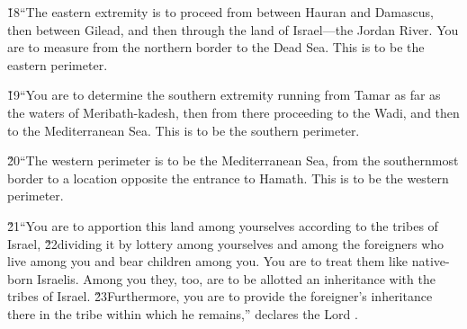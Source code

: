 \v{18}``The eastern extremity is to proceed from between Hauran and Damascus, then between Gilead, and then through the land of Israel---the Jordan River. You are to measure from the northern border to the Dead Sea. This is to be the eastern perimeter.

\v{19}``You are to determine the southern extremity running from Tamar as far as the waters of Meribath-kadesh, then from there proceeding to the Wadi, and then to the Mediterranean Sea. This is to be the southern perimeter.

\v{20}``The western perimeter is to be the Mediterranean Sea, from the southernmost border to a location opposite the entrance to Hamath. This is to be the western perimeter.

\v{21}``You are to apportion this land among yourselves according to the tribes of Israel, \v{22}dividing it by lottery among yourselves and among the foreigners who live among you and bear children among you. You are to treat them like native-born Israelis. Among you they, too, are to be allotted an inheritance with the tribes of Israel. \v{23}Furthermore, you are to provide the foreigner's inheritance there in the tribe within which he remains,'' declares the Lord .

